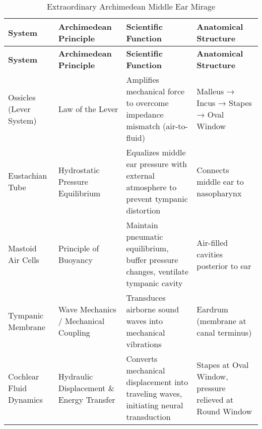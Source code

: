 \documentclass{article}
\begin{document}
\begin{landscape}

\begin{longtable}{>{\raggedright\arraybackslash}p{3.5cm} >{\raggedright\arraybackslash}p{4cm} >{\raggedright\arraybackslash}p{5.2cm} >{\raggedright\arraybackslash}p{4cm}}
\caption{Extraordinary Archimedean Middle Ear Mirage} \\
\textbf{System} & \textbf{Archimedean Principle} & \textbf{Scientific Function} & \textbf{Anatomical Structure} \\
\hline
\endfirsthead

\textbf{System} & \textbf{Archimedean Principle} & \textbf{Scientific Function} & \textbf{Anatomical Structure} \\
\hline
\endhead

Ossicles (Lever System) & Law of the Lever & Amplifies mechanical force to overcome impedance mismatch (air-to-fluid) & Malleus → Incus → Stapes → Oval Window \\

Eustachian Tube & Hydrostatic Pressure Equilibrium & Equalizes middle ear pressure with external atmosphere to prevent tympanic distortion & Connects middle ear to nasopharynx \\

Mastoid Air Cells & Principle of Buoyancy & Maintain pneumatic equilibrium, buffer pressure changes, ventilate tympanic cavity & Air-filled cavities posterior to ear \\

Tympanic Membrane & Wave Mechanics / Mechanical Coupling & Transduces airborne sound waves into mechanical vibrations & Eardrum (membrane at canal terminus) \\

Cochlear Fluid Dynamics & Hydraulic Displacement \& Energy Transfer & Converts mechanical displacement into traveling waves, initiating neural transduction & Stapes at Oval Window, pressure relieved at Round Window \\

\end{longtable}

\end{landscape}
\end{document}
